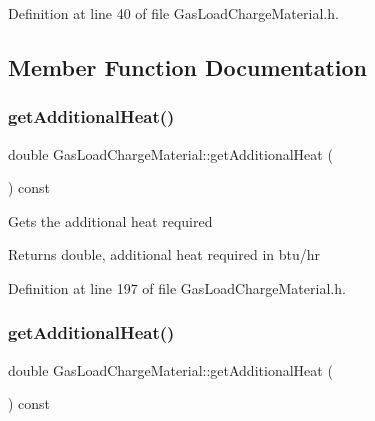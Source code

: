 Definition at line 40 of file Gas\+Load\+Charge\+Material.\+h.



\subsection{Member Function Documentation}
\mbox{\label{class_gas_load_charge_material_a5c01f171b61c01c93db6453cb122e1ba}} 
\subsubsection{\texorpdfstring{get\+Additional\+Heat()}{getAdditionalHeat()}\hspace{0.1cm}{\footnotesize\ttfamily [1/3]}}
{\footnotesize\ttfamily double Gas\+Load\+Charge\+Material\+::get\+Additional\+Heat (\begin{DoxyParamCaption}{ }\end{DoxyParamCaption}) const\hspace{0.3cm}{\ttfamily [inline]}}

Gets the additional heat required \begin{DoxyReturn}{Returns}
double, additional heat required in btu/hr 
\end{DoxyReturn}


Definition at line 197 of file Gas\+Load\+Charge\+Material.\+h.

\mbox{\label{class_gas_load_charge_material_a5c01f171b61c01c93db6453cb122e1ba}} 
\subsubsection{\texorpdfstring{get\+Additional\+Heat()}{getAdditionalHeat()}\hspace{0.1cm}{\footnotesize\ttfamily [2/3]}}
{\footnotesize\ttfamily double Gas\+Load\+Charge\+Material\+::get\+Additional\+Heat (\begin{DoxyParamCaption}{ }\end{DoxyParamCaption}) const\hspace{0.3cm}{\ttfamily [inline]}}

